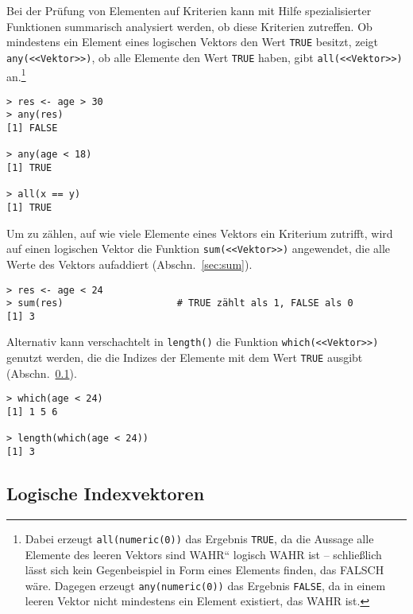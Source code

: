 Bei der Prüfung von Elementen auf Kriterien kann mit Hilfe spezialisierter Funktionen summarisch analysiert werden, ob diese Kriterien zutreffen. Ob mindestens ein Element eines logischen Vektors den Wert \lstinline!TRUE! besitzt, zeigt \lstinline!any(<<Vektor>>)!, ob alle Elemente den Wert \lstinline!TRUE! haben, gibt \lstinline!all(<<Vektor>>)! an.\footnote{Dabei erzeugt \lstinline!all(numeric(0))! das Ergebnis \lstinline!TRUE!, da die Aussage {\quotedblbase}alle Elemente des leeren Vektors sind WAHR{\textquotedblleft} logisch WAHR ist -- schließlich lässt sich kein Gegenbeispiel in Form eines Elements finden, das FALSCH wäre. Dagegen erzeugt \lstinline!any(numeric(0))! das Ergebnis \lstinline!FALSE!, da in einem leeren Vektor nicht mindestens ein Element existiert, das WAHR ist.}
\begin{lstlisting}
> res <- age > 30
> any(res)
[1] FALSE

> any(age < 18)
[1] TRUE

> all(x == y)
[1] TRUE
\end{lstlisting}

Um zu zählen, auf wie viele Elemente eines Vektors ein Kriterium zutrifft, wird auf einen logischen Vektor die Funktion \lstinline!sum(<<Vektor>>)! angewendet, die alle Werte des Vektors aufaddiert (Abschn.\ \ref{sec:sum}).
\begin{lstlisting}
> res <- age < 24
> sum(res)                    # TRUE zählt als 1, FALSE als 0
[1] 3
\end{lstlisting}

Alternativ kann verschachtelt in \lstinline!length()! die Funktion \lstinline!which(<<Vektor>>)! genutzt werden, die die Indizes der Elemente mit dem Wert \lstinline!TRUE! ausgibt (Abschn.\ \ref{sec:which}).
\begin{lstlisting}
> which(age < 24)
[1] 1 5 6

> length(which(age < 24))
[1] 3
\end{lstlisting}

\subsection{Logische Indexvektoren}
\label{sec:which}


